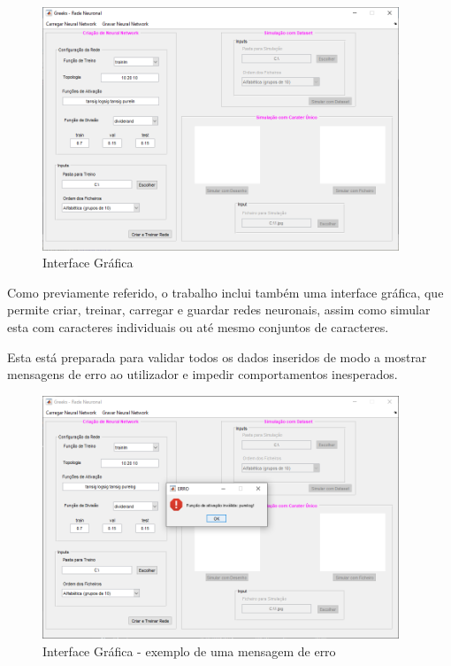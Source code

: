 \documentclass[11pt]{article}
\begin{document}
	\begin{figure}[H]
		\includegraphics[width=0.95\textwidth,height=0.88\textheight,keepaspectratio]{gui}
		\centering
		\caption{Interface Gráfica}
		\label{fig:gui}
	\end{figure}
	
	Como previamente referido, o trabalho inclui também uma interface gráfica, que permite criar, treinar, carregar e guardar redes neuronais, assim como simular esta com caracteres individuais ou até mesmo conjuntos de caracteres.
	
	Esta está preparada para validar todos os dados inseridos de modo a mostrar mensagens de erro ao utilizador e impedir comportamentos inesperados.
	
	\begin{figure}[H]
		\includegraphics[width=0.95\textwidth,height=0.88\textheight,keepaspectratio]{gui-error}
		\centering
		\caption{Interface Gráfica - exemplo de uma mensagem de erro}
		\label{fig:gui-error}
	\end{figure}
	
\end{document}
